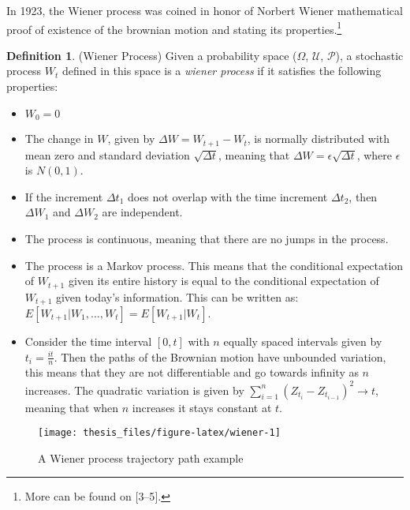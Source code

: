 \documentclass[12pt,twoside]{reedthesis}
\theoremstyle{definition}
\newtheorem{definition}{Definition}[section]
\theoremstyle{definition}
\theoremstyle{remark}
\begin{document}
  In 1923, the Wiener process was coined in honor of Norbert Wiener
  mathematical proof of existence of the brownian motion and stating its
  properties.\footnote{More can be found on {[}3--5{]}.}
  \begin{definition}{(Wiener Process)} Given a probability space ($\Omega$, $\mathcal {U}$, $\mathcal {P}$), a stochastic process $W_t$ defined in this space is a \textit{wiener process} if it satisfies the following properties:
  \begin{itemize}
    \item  $W_{0}=0$
    
    \item The change in $W$, given by $\Delta W = W_{t+1}-W_{t}$, is normally distributed with mean zero and standard deviation $\sqrt{\Delta t}$, meaning that $\Delta W = \epsilon\sqrt{\Delta t}$, where $\epsilon$ is $N(0,1)$.
    
    \item If the increment $\Delta t_1$ does not overlap with the time increment $\Delta t_2$, then $\Delta W_1$ and $\Delta W_2$ are independent.
    
    \item The process is continuous, meaning that there are no jumps in the process.
    
    \item The process is a Markov process. This means that the conditional expectation of $W_{t+1}$ given its entire history is equal to the conditional expectation of $W_{t+1}$ given today's information. This can be written as: $E[W_{t+1}|W_1, ..., W_t] = E[W_{t+1}|W_t]$.
    
    \item Consider the time interval $[0,t]$ with $n$ equally spaced intervals given by $t_i = \frac{it}{n}$. Then the paths of the Brownian motion have unbounded variation, this means that they are not differentiable and go towards infinity as $n$ increases. The quadratic variation is given by $\sum_{i=1}^{n}{(Z_{t_i}-Z_{t_{i-1}})^2} \rightarrow t$, meaning that when $n$ increases it stays constant at $t$. 
  
  \end{itemize}
  \end{definition}
  \begin{figure}
  
  {\centering \texttt{[image: thesis\_files/figure-latex/wiener-1]} 
  
  }
  
  \caption{A Wiener process trajectory path example \label{wiener}}\label{fig:wiener}
  \end{figure}
\end{document}
